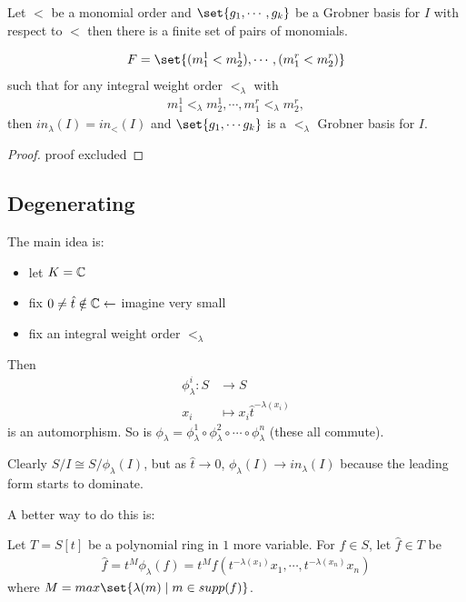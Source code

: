 \begin{theorem}
Let $<$ be a monomial order and $\set{ g_1, \cdots, g_k }$ be a Grobner basis for $I$ with respect to $<$ then there is a finite set of pairs of monomials.

\begin{align*}
    F = \set{ (m_1^1 < m_2^1 ) , \cdots, ( m_1^r < m_2^r ) }
\end{align*}
such that for any integral weight order $<_\lambda$ with 
\begin{align*}
m_1^1 <_\lambda m_2^1, \cdots , m_1^r <_\lambda m_2^r,
\end{align*}
then $in_\lambda (I) = in_< (I)$ and $\set{g_1, \cdots g_k}$ is a $<_\lambda $ Grobner basis for $I$.
\end{theorem}

\begin{proof}
proof excluded
\end{proof}

\subsection{Degenerating}

The main idea is:
\begin{itemize}
    \item let $K = \mathbb{C}$
    \item fix $0 \neq\hat{t} \notin \mathbb{C} \leftarrow$ imagine very small
    \item fix an integral weight order $<_\lambda$
\end{itemize}

Then
\begin{align*}
    \phi_\lambda^i : S &\to S\\
    x_i &\mapsto x_i \hat{t}^{- \lambda (x_i)}
\end{align*}
is an automorphism. So is $\phi_\lambda = \phi_\lambda^1 \circ \phi_\lambda^2 \circ \cdots \circ \phi_\lambda^n$ (these all commute).

Clearly $S/I \cong S / \phi_\lambda (I)$, but as $\hat{t} \to 0$, $\phi_\lambda (I) \to in_\lambda(I)$ because the leading form starts to dominate.

A better way to do this is:

Let $T = S[ t]$ be a polynomial ring in $1$ more variable. For $f \in S$, let $\hat{f} \in T$ be
\begin{align*}
    \hat{f} = t^M \phi_\lambda (f) = t^M f(t^{-\lambda (x_1)} x_1, \cdots,t^{-\lambda (x_n)} x_n)
\end{align*}
where $M = max \set{ \lambda(m) \mid m \in supp(f) }$.


